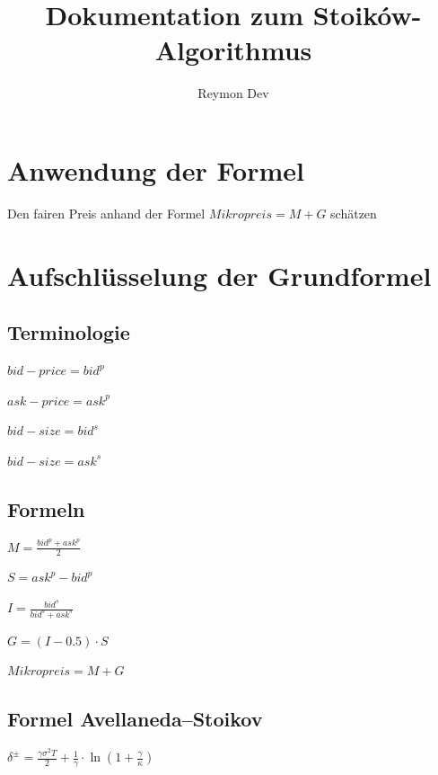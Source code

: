 \documentclass[11pt]{article}
\begin{document}
\title{Dokumentation zum Stoików-Algorithmus}
\author{Reymon Dev}
\maketitle


\section{Anwendung der Formel}

Den fairen Preis anhand der Formel $Mikropreis = M + G$ schätzen

\section{Aufschlüsselung der Grundformel}

\subsection{Terminologie}

$bid-price = bid^p$

$ask-price = ask^p$

$bid-size  = bid^s$

$bid-size  = ask^s$

\subsection{Formeln}

$M = \frac{bid^p + ask^p}{2}$

$S = ask^p - bid^p$

$I = \frac{bid^s}{bid^s + ask^s}$

$G = \left(I - 0.5\right) \cdot S$

$Mikropreis = M + G$

\subsection{Formel Avellaneda–Stoikov}

$\delta^{\pm} = \frac{\gamma \sigma^2 T}{2} + \frac{1}{\gamma} \cdot \ln\left(1 + \frac{\gamma}{\kappa}\right)$
\end{document}
